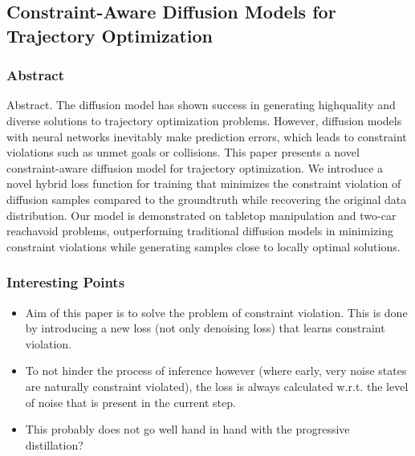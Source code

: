 
\subsection{Constraint-Aware Diffusion Models for Trajectory
Optimization}
\subsubsection{Abstract}
Abstract. The diffusion model has shown success in generating highquality and diverse solutions to trajectory optimization problems. However, diffusion models with neural networks inevitably make prediction
errors, which leads to constraint violations such as unmet goals or collisions. This paper presents a novel constraint-aware diffusion model for
trajectory optimization. We introduce a novel hybrid loss function for
training that minimizes the constraint violation of diffusion samples compared to the groundtruth while recovering the original data distribution.
Our model is demonstrated on tabletop manipulation and two-car reachavoid problems, outperforming traditional diffusion models in minimizing
constraint violations while generating samples close to locally optimal
solutions.
\subsubsection{Interesting Points}
\begin{itemize}
    \item Aim of this paper is to solve the problem of constraint violation. This is done by introducing a new loss (not only denoising loss) that learns constraint violation.
    \item To not hinder the process of inference however (where early, very noise states are naturally constraint violated), the loss is always calculated w.r.t. the level of noise that is present in the current step.
    \item This probably does not go well hand in hand with the progressive distillation?
\end{itemize}